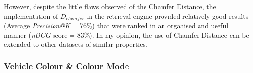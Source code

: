 \begin{landscape}
\begin{table}[]
\caption{Comparison of 5 distance measures (Chamfer Distance, Dynamic Time Warping, Hausdorff Distance, Earth Mover Distance, Euclidean Distance) in 7 specific test scenarios -- (1) Mirror, (2) Opposite Direction, (3) Short Trajectory, (4) Highly Resemble GT, (5) Partially Resemble GT, (6) Long Trajectories, (7) Similar Shape, against ground truth sample data. Overall results showed the superiority of Chamfer Distance in normalised distances. The actual distance measures are shown in parentheses. Smaller numbers represent higher similarity and vice versa. %
}
\label{table:DistanceCompare}
\end{table}
\end{landscape}

However, despite the little flaws observed of the Chamfer Distance, the implementation of $D_{chamfer}$ in the retrieval engine provided relatively good results (Average \textit{Precision@K} = 76\%) that were ranked in an organised and useful manner (\textit{nDCG} score = 83\%). In my opinion, the use of Chamfer Distance can be extended to other datasets of similar properties.

\subsubsection{Vehicle Colour \& Colour Mode}
\label{subsec:vehiclecolourchamferdistanceexperiment}

